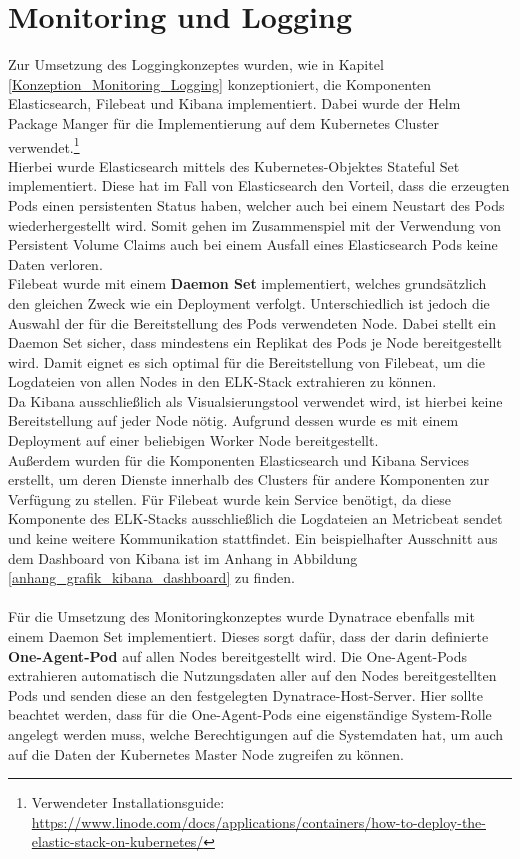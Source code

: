 \section{Monitoring und Logging}
\label{Umsetzung_Monitoring_Logging}
Zur Umsetzung des Loggingkonzeptes wurden, wie in Kapitel \ref{Konzeption_Monitoring_Logging} konzeptioniert, die Komponenten Elasticsearch, Filebeat und Kibana implementiert. Dabei wurde der Helm Package Manger für die Implementierung auf dem Kubernetes Cluster verwendet.\footnote{Verwendeter Installationsguide: \url{https://www.linode.com/docs/applications/containers/how-to-deploy-the-elastic-stack-on-kubernetes/}} 
\\
Hierbei wurde Elasticsearch mittels des Kubernetes-Objektes Stateful Set implementiert. Diese hat im Fall von Elasticsearch den Vorteil, dass die erzeugten Pods einen persistenten Status haben, welcher auch bei einem Neustart des Pods wiederhergestellt wird. Somit gehen im Zusammenspiel mit der Verwendung von Persistent Volume Claims auch bei einem Ausfall eines Elasticsearch Pods keine Daten verloren.\\ 
Filebeat wurde mit einem \textbf{Daemon Set} implementiert, welches grundsätzlich den gleichen Zweck wie ein Deployment verfolgt. Unterschiedlich ist jedoch die Auswahl der für die Bereitstellung des Pods verwendeten Node. Dabei stellt ein Daemon Set sicher, dass mindestens ein Replikat des Pods je Node bereitgestellt wird.\autocite[Vgl.][Daemon Set]{KubernetesAuthors.20191210} Damit eignet es sich optimal für die Bereitstellung von Filebeat, um die Logdateien von allen Nodes in den ELK-Stack extrahieren zu können.\\
Da Kibana ausschließlich als Visualsierungstool verwendet wird, ist hierbei keine Bereitstellung auf jeder Node nötig. Aufgrund dessen wurde es mit einem Deployment auf einer beliebigen Worker Node bereitgestellt.\\
Außerdem wurden für die Komponenten Elasticsearch und Kibana Services erstellt, um deren Dienste innerhalb des Clusters für andere Komponenten zur Verfügung zu stellen. Für Filebeat wurde kein Service benötigt, da diese Komponente des ELK-Stacks ausschließlich die Logdateien an Metricbeat sendet und keine weitere Kommunikation stattfindet. Ein beispielhafter Ausschnitt aus dem Dashboard von Kibana ist im Anhang in Abbildung \ref{anhang_grafik_kibana_dashboard} zu finden.\\
\\
Für die Umsetzung des Monitoringkonzeptes wurde Dynatrace ebenfalls mit einem Daemon Set implementiert. Dieses sorgt dafür, dass der darin definierte \textbf{One-Agent-Pod} auf allen Nodes bereitgestellt wird. Die One-Agent-Pods extrahieren automatisch die Nutzungsdaten aller auf den Nodes bereitgestellten Pods und senden diese an den festgelegten Dynatrace-Host-Server. Hier sollte beachtet werden, dass für die One-Agent-Pods eine eigenständige System-Rolle angelegt werden muss, welche Berechtigungen auf die Systemdaten hat, um auch auf die Daten der Kubernetes Master Node zugreifen zu können.\\ 
